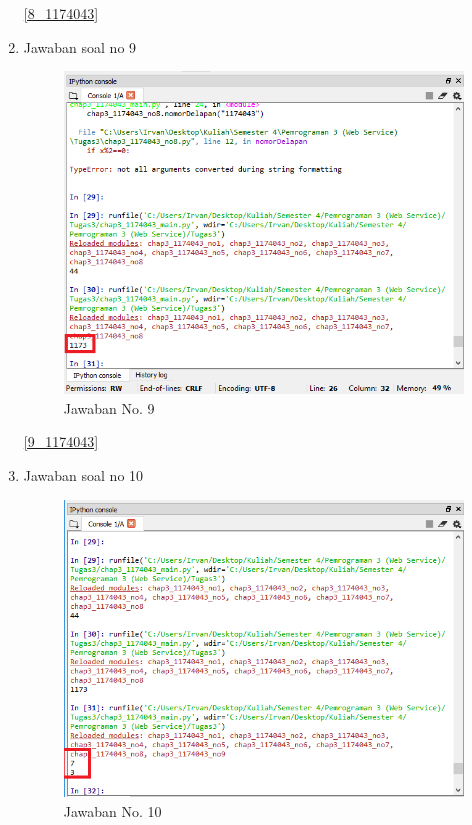 \begin{enumerate}
				\ref{8_1174043}
				
			\item Jawaban soal no 9
				
				
				\begin{figure} [ht]
					\centerline{\includegraphics[width=1\textwidth]{figures/chapter3/9_1174043.png}}
					\caption{Jawaban No. 9}
					\label{9}
				\end{figure}

				\ref{9_1174043}
				
			\item Jawaban soal no 10
				
				
				\begin{figure} [ht]
					\centerline{\includegraphics[width=1\textwidth]{figures/chapter3/10_1174043.png}}
					\caption{Jawaban No. 10}
					\label{10}
				\end{figure}


\end{enumerate}
